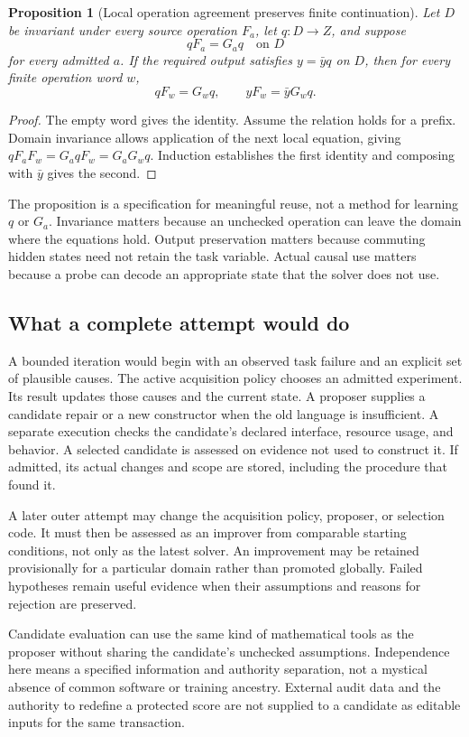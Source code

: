 \documentclass[11pt,letterpaper]{article}
\theoremstyle{plain}
\newtheorem{proposition}[theorem]{Proposition}
\theoremstyle{definition}
\begin{document}
\begin{proposition}[Local operation agreement preserves finite continuation]\label{prop:continuation}
Let $D$ be invariant under every source operation $F_a$, let $q:D\to Z$, and suppose
\[
qF_a=G_aq\quad\text{on }D
\]
for every admitted $a$. If the required output satisfies $y=\bar yq$ on $D$, then for every finite operation word $w$,
\[
qF_w=G_wq,\qquad yF_w=\bar yG_wq.
\]
\end{proposition}
\begin{proof}
The empty word gives the identity. Assume the relation holds for a prefix. Domain invariance allows application of the next local equation, giving $qF_aF_w=G_aqF_w=G_aG_wq$. Induction establishes the first identity and composing with $\bar y$ gives the second.
\end{proof}

The proposition is a specification for meaningful reuse, not a method for learning $q$ or $G_a$. Invariance matters because an unchecked operation can leave the domain where the equations hold. Output preservation matters because commuting hidden states need not retain the task variable. Actual causal use matters because a probe can decode an appropriate state that the solver does not use.

\subsection{What a complete attempt would do}
A bounded iteration would begin with an observed task failure and an explicit set of plausible causes. The active acquisition policy chooses an admitted experiment. Its result updates those causes and the current state. A proposer supplies a candidate repair or a new constructor when the old language is insufficient. A separate execution checks the candidate's declared interface, resource usage, and behavior. A selected candidate is assessed on evidence not used to construct it. If admitted, its actual changes and scope are stored, including the procedure that found it.

A later outer attempt may change the acquisition policy, proposer, or selection code. It must then be assessed as an improver from comparable starting conditions, not only as the latest solver. An improvement may be retained provisionally for a particular domain rather than promoted globally. Failed hypotheses remain useful evidence when their assumptions and reasons for rejection are preserved.

Candidate evaluation can use the same kind of mathematical tools as the proposer without sharing the candidate's unchecked assumptions. Independence here means a specified information and authority separation, not a mystical absence of common software or training ancestry. External audit data and the authority to redefine a protected score are not supplied to a candidate as editable inputs for the same transaction.
\end{document}
